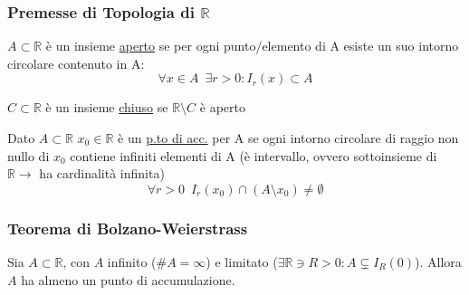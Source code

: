 \documentclass[10pt]{article}
\theoremstyle{plain}
\begin{document}
\subsubsection{Premesse di Topologia di \texorpdfstring{$\mathbb{R}$}{$\mathbb{R}$}}
\begin{description}
    \item[Aperto] $A \subset \mathbb{R}$ è un insieme \underline{aperto} se per ogni punto/elemento di A esiste un suo intorno circolare contenuto in A: \[\forall x \in A \enspace \exists r > 0 : I_r(x) \subset A\]
    \item[Chiuso] $C \subset \mathbb{R}$ è un insieme \underline{chiuso} se $\mathbb{R} \setminus C$ è aperto
    \hypertarget{accumulaz}{\item[Punto di accumulazione] Dato $A \subset \mathbb{R}$ $x_0 \in \mathbb{R}$ è un \underline{p.to di acc.} per A se ogni intorno circolare di raggio non nullo di $x_0$ contiene infiniti elementi di A (è intervallo, ovvero sottoinsieme di $\mathbb{R} \rightarrow$ ha cardinalità infinita) \[\forall r > 0 \enspace I_r(x_0) \cap (A \setminus {x_0}) \neq \emptyset\]}
\end{description}

\subsubsection{Teorema di Bolzano-Weierstrass}
\begin{ther}[\textbf{T. di B.-W.}]
Sia $A \subset \mathbb{R}$, con $A$ infinito ($\#A = \infty$) e limitato ($\exists \mathbb{R} \owns R > 0 : A \subsetneq I_R(0)$). \newline
Allora $A$ ha almeno un punto di accumulazione.
\end{ther}
\end{document}
